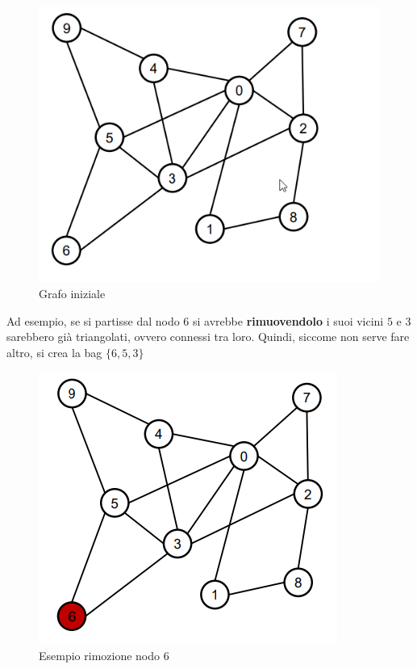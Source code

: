 \begin{figure}[H]
    \begin{center}
        \includegraphics[scale=0.5]{chapters/images/Grafopertree.png}
    \end{center}
    \caption{Grafo iniziale}
\end{figure}

Ad esempio, se si partisse dal nodo $6$ si avrebbe \textbf{rimuovendolo} i suoi
vicini $5$ e $3$ sarebbero già triangolati, ovvero connessi tra loro. Quindi,
siccome non serve fare altro, si crea la bag $\{6,5,3\}$

\begin{figure}[H]
    \begin{center}
        \includegraphics[scale=0.5]{chapters/images/esrimozioen.png}
    \end{center}
    \caption{Esempio rimozione nodo 6}
\end{figure}

